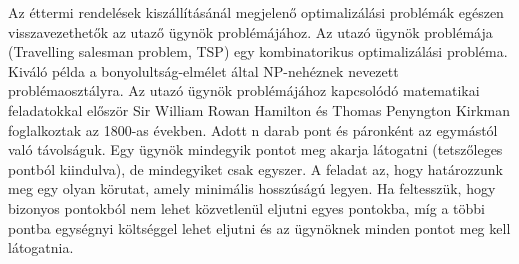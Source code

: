 
Az éttermi rendelések kiszállításánál megjelenő optimalizálási problémák egészen visszavezethetők az utaző ügynök problémájához. Az utazó ügynök problémája (Travelling salesman problem, TSP) egy kombinatorikus optimalizálási probléma. Kiváló példa a bonyolultság-elmélet által NP-nehéznek nevezett problémaosztályra. Az utazó ügynök problémájához kapcsolódó matematikai feladatokkal először Sir William Rowan Hamilton és Thomas Penyngton Kirkman foglalkoztak az 1800-as években. Adott n darab pont és páronként az egymástól való távolságuk. Egy ügynök mindegyik pontot meg akarja látogatni (tetszőleges pontból kiindulva), de mindegyiket csak egyszer. A feladat az, hogy határozzunk meg egy olyan körutat, amely minimális hosszúságú legyen. Ha feltesszük, hogy bizonyos pontokból nem lehet közvetlenül eljutni egyes pontokba, míg a többi pontba egységnyi költséggel lehet eljutni és az ügynöknek minden pontot meg kell látogatnia.
